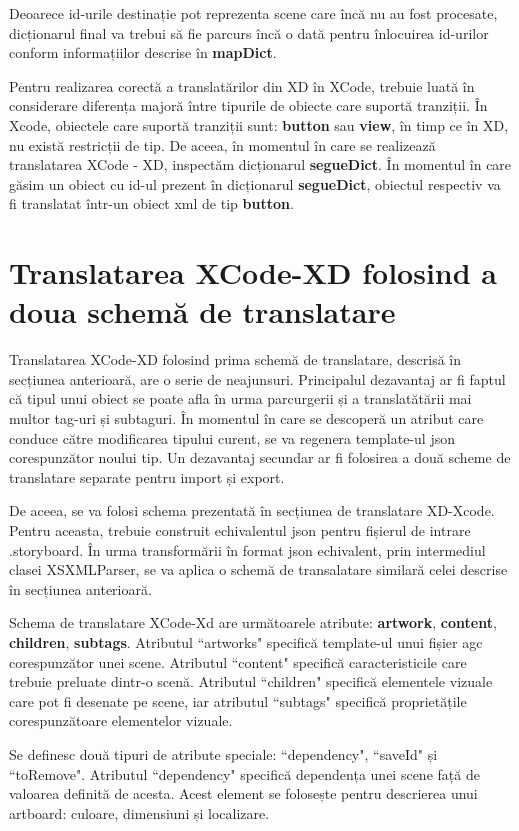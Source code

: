 Deoarece id-urile destinație pot reprezenta scene care încă nu au fost procesate, dicționarul final va trebui să fie parcurs încă o dată pentru înlocuirea id-urilor conform informațiilor descrise în \textbf{mapDict}.

Pentru realizarea corectă a translatărilor din XD în XCode, trebuie luată în considerare diferența majoră între tipurile de obiecte care suportă tranziții. În Xcode, obiectele care suportă tranziții sunt: \textbf{button} sau \textbf{view}, în timp ce în XD, nu există restricții de tip. De aceea, în momentul în care se realizează translatarea XCode - XD, inspectăm dicționarul \textbf{segueDict}. În momentul în care găsim un obiect cu id-ul prezent în dicționarul  \textbf{segueDict}, obiectul respectiv va fi translatat într-un obiect xml de tip \textbf{button}.

\section {Translatarea XCode-XD folosind a doua schemă de translatare}

Translatarea XCode-XD folosind prima schemă de translatare, descrisă în secțiunea anterioară, are o serie de neajunsuri. Principalul dezavantaj ar fi faptul că tipul unui obiect se poate afla în urma parcurgerii și a translatătării mai multor tag-uri și subtaguri. În momentul în care se descoperă un atribut care conduce către modificarea tipului curent, se va regenera template-ul json corespunzător noului tip.  
Un dezavantaj secundar ar fi folosirea a două scheme de translatare separate pentru import și export.

De aceea, se va folosi schema prezentată în secțiunea de translatare XD-Xcode. Pentru aceasta, trebuie construit echivalentul json pentru fișierul de intrare .storyboard. În urma transformării în format json echivalent, prin intermediul clasei XSXMLParser, se va aplica o schemă de transalatare similară celei descrise în secțiunea anterioară.

Schema de translatare XCode-Xd are următoarele atribute: \textbf{artwork}, \textbf{content}, \textbf{children}, \textbf{subtags}. Atributul ``artworks" specifică template-ul unui fișier agc corespunzător unei scene. Atributul ``content" specifică caracteristicile care trebuie preluate dintr-o scenă. Atributul ``children" specifică elementele vizuale care pot fi desenate pe scene, iar atributul ``subtags" specifică proprietățile corespunzătoare elementelor vizuale.

Se definesc două tipuri de atribute speciale: ``dependency", ``saveId" și ``toRemove". Atributul ``dependency" specifică
dependența unei scene față de valoarea definită de acesta. Acest element se folosește pentru descrierea unui artboard: culoare, dimensiuni și localizare.

